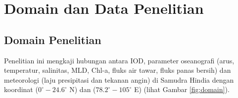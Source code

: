 \vspace{1.5pc}
\section[Domain dan Data Penelitian]{Domain dan Data Penelitian}
\begin{spacing}{1.5}
	\subsection[Domain Penelitian]{Domain Penelitian}
	Penelitian ini mengkaji hubungan antara IOD, parameter oseanografi (arus, temperatur, salinitas, MLD, Chl-a, fluks air tawar, fluks panas bersih) dan meteorologi (laju presipitasi dan tekanan angin) di Samudra Hindia dengan koordinat ($0^\circ-24.6^\circ$ N) dan ($78.2^\circ-105^\circ$ E) (lihat Gambar \ref{fig:domain}).


\end{spacing}

